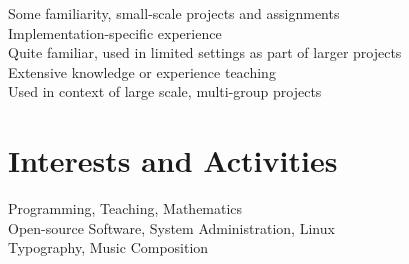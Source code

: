 \documentclass[a4paper,10pt]{article}
\begin{document}
\vspace{1em}

\begin{center}
\parbox{12cm}{
\onenote Some familiarity, small-scale projects and assignments \\
\twonotes Implementation-specific experience \\
\threenotes Quite familiar, used in limited settings as part of larger projects \\
\fournotes Extensive knowledge or experience teaching \\
\fivenotes Used in context of large scale, multi-group projects}
\end{center}

\vspace{1em}

\section{Interests and Activities}
Programming, Teaching, Mathematics\\
Open-source Software, System Administration, Linux\\
Typography, Music Composition

\end{document}
